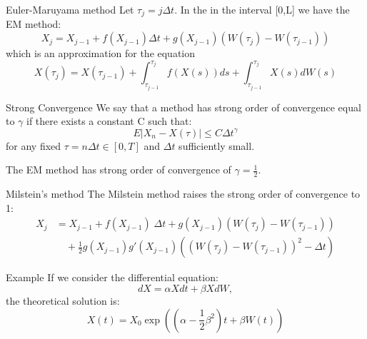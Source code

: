 \begin{frame}{Euler-Maruyama method}
Let $\tau_j=j\Delta t$. In the in the interval [0,L] we have the EM method:\bigskip\\
$$X_j=X_{j-1}+f(X_{j-1})\Delta t+g(X_{j-1})(W(\tau_j)-W(\tau_{j-1}))$$
 which is an approximation for the equation
$$X(\tau_j)=X(\tau_{j-1})+\int_{\tau_{j-1}}^{\tau_{j}}f(X(s))ds+\int_
{\tau_{j-1}}^{\tau_{j}}X(s)dW(s)$$
\end{frame}

\begin{frame}
\begin{block}{Strong Convergence}
We say that a method has strong order of convergence equal to $\gamma$ if there exists a constant C such that:
$$E|X_n-X(\tau)|\leq C \Delta t^\gamma$$
for any fixed $\tau=n \Delta t \in [0,T]$ and $\Delta t$ sufficiently small.
\end{block}
\bigskip
The EM method has strong order of convergence of $\gamma=\frac{1}{2}$.
\end{frame}

\begin{frame}{Milstein's method}
The Milstein method raises the strong order of convergence to 1:	
	\begin{equation*}
	\begin{split}
	X_{j} & =X_{j-1}+ f(X_{j-1}) \; \Delta t + g(X_{j-1})(W(\tau_j)-W(\tau_{j-1}))\\
	  &\quad +\frac{1}{2}g(X_{j-1})g'(X_{j-1})((W(\tau_j)-W(\tau_{j-1}))^2-\Delta t)
	\end{split}
	\end{equation*}
\end{frame}

\begin{frame}{Example}
If we consider the differential equation:
\begin{equation*}
  dX=\alpha X dt+ \beta X dW,
\end{equation*}
the theoretical solution is: 
\begin{equation*}
  X(t)=X_{0}\exp{\left((\alpha -\frac{1}{2}\beta ^2)t +\beta W(t)\right)}
\end{equation*}
\end{frame}

